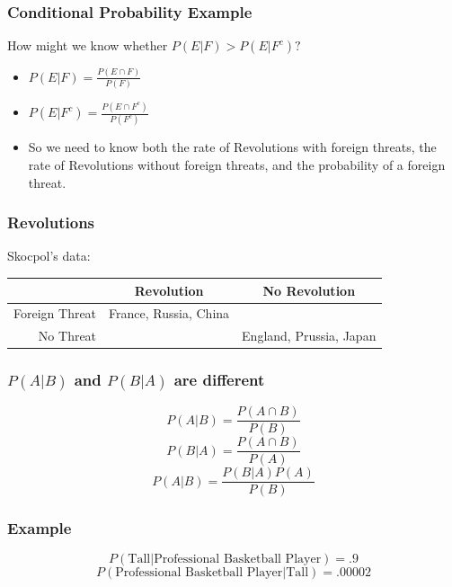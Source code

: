 \documentclass{beamer}
\numberwithin{equation}{section}
\begin{document}
\begin{frame}
\frametitle{Conditional Probability Example}
How might we know whether $P(E|F)>P(E|F^c)?$\pause
\begin{itemize}
\item $P(E|F)=\frac{P(E\cap F)}{P(F)}$
\item $P(E|F^c)=\frac{P(E\cap F^c)}{P(F^c)}$
\item So we need to know both the rate of Revolutions with foreign threats, the rate of Revolutions without foreign threats, and the probability of a foreign threat.
\end{itemize}

\end{frame}

\begin{frame}
\frametitle{Revolutions}
Skocpol's data:\\
\vspace{1 cm}

\begin{tabular}{r|cc}
&Revolution&No Revolution\\
\hline
Foreign Threat& France, Russia, China\\
No Threat&& England, Prussia, Japan\\
\end{tabular}
\end{frame}



\begin{frame}
\frametitle{$P(A|B)$ and $P(B|A)$ are different}

$$P(A|B) = \frac{P(A\cap B)}{P(B)}$$\pause
$$P(B|A)  =  \frac{P(A \cap B) } {P(A)}$$\pause
$$P(A|B)  =  \frac{P(B|A)P(A)} {P(B)} $$
\end{frame}


\begin{frame}
\frametitle{Example}
$$P(\text{Tall}|\text{Professional Basketball Player})=.9$$
$$P(\text{Professional Basketball Player}|\text{Tall})=.00002$$
\end{frame}
\end{document}
